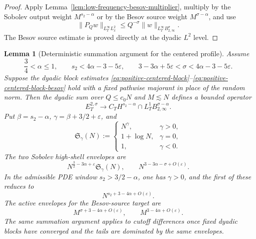 \documentclass[10pt]{amsart}
\numberwithin{equation}{section}
\theoremstyle{plain}
\newtheorem{lemma}[theorem]{Lemma}
\theoremstyle{definition}
\theoremstyle{remark}
\newcommand{\Btwo}{B_{2,\infty}}
\newcommand{\eps}{\varepsilon}
\begin{document}
\begin{proof}
Apply Lemma~\ref{lem:low-frequency-besov-multiplier}, multiply by the Sobolev output weight $M^{s_2-\alpha}$ or by the Besov source weight $M^{\sigma-\alpha}$, and use
\[
        \|P_Qw\|_{L_T^\infty L^2_x}\le Q^{-\sigma}\|w\|_{L_T^\infty\Btwo^\sigma}.
\]
The Besov source estimate is proved directly at the dyadic $L^2$ level.
\end{proof}


\begin{lemma}[Deterministic summation argument for the centered profile]\label{lem:centered-deterministic-summation-table}
Assume
\[
        \frac34<\alpha\le1,
        \qquad
        s_2<4\alpha-3-5\eps,
        \qquad
        3-3\alpha+5\eps<\sigma<4\alpha-3-5\eps.
\]
Suppose the dyadic block estimates \eqref{eq:positive-centered-block}--\eqref{eq:positive-centered-block-besov} hold with a fixed pathwise majorant in place of the random norm.  Then the dyadic sum over \(Q\le c_0N\) and \(M\lesssim N\) defines a bounded operator
\[
        E_T^{2,\sigma}\longrightarrow C_TH^{s_2-\alpha}
        \cap L_T^1B_{2,\infty}^{\sigma-\alpha}.
\]
Put \(\beta=s_2-\alpha\), \(\gamma=\beta+3/2+\eps\), and
\[
        \mathfrak S_\gamma(N):=
        \begin{cases}
        N^\gamma,&\gamma>0,\\
        1+\log N,&\gamma=0,\\
        1,&\gamma<0.
        \end{cases}
\]
The two Sobolev high-shell envelopes are
\[
        N^{\frac32-3\alpha+\eps}\mathfrak S_\gamma(N),
        \qquad
        N^{3-3\alpha-\sigma+O(\eps)}.
\]
In the admissible PDE window \(s_2>3/2-\alpha\), one has \(\gamma>0\), and the first of these reduces to
\[
        N^{s_2+3-4\alpha+O(\eps)}.
\]
The active envelopes for the Besov-source target are
\[
        M^{\sigma+3-4\alpha+O(\eps)},
        \qquad
        M^{3-4\alpha+O(\eps)}.
\]
The same summation argument applies to cutoff differences once fixed dyadic blocks have converged and the tails are dominated by the same envelopes.
\end{lemma}
\end{document}

